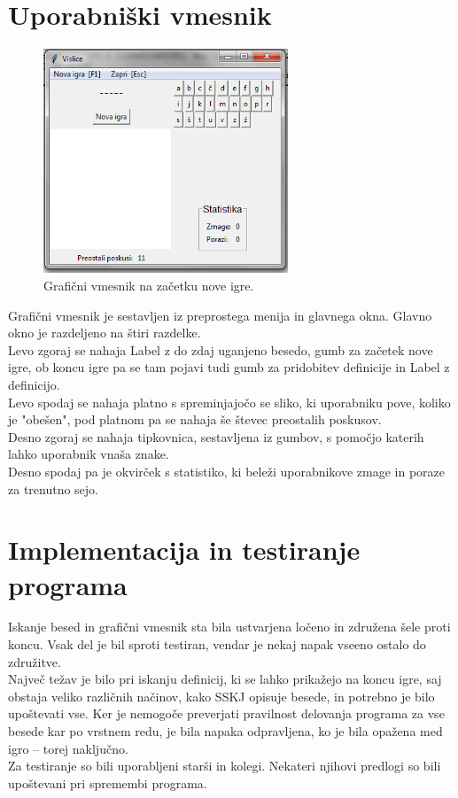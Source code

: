 \documentclass [a4paper, 12pt] {article}
\begin{document}
\section {Uporabniški vmesnik}
\begin {figure} [h]
\centering
\includegraphics [height=190pt] {slike/za_porocilo_gui.png}
\caption {Grafični vmesnik na začetku nove igre.}
\end {figure}
\noindent Grafični vmesnik je sestavljen iz preprostega menija in glavnega okna.  Glavno okno je razdeljeno na štiri razdelke. \\
Levo zgoraj se nahaja Label z do zdaj uganjeno besedo, gumb za začetek nove igre, ob koncu igre pa se tam pojavi tudi gumb za pridobitev definicije in Label z definicijo. \\
Levo spodaj se nahaja platno s spreminjajočo se sliko, ki uporabniku pove, koliko je "obešen", pod platnom pa se nahaja še števec preostalih poskusov.  \\
Desno zgoraj se nahaja tipkovnica, sestavljena iz gumbov, s pomočjo katerih lahko uporabnik vnaša znake. \\
Desno spodaj pa je okvirček s statistiko, ki beleži uporabnikove zmage in poraze za trenutno sejo. 

\section {Implementacija in testiranje programa}
Iskanje besed in grafični vmesnik sta bila ustvarjena ločeno in združena šele proti koncu. Vsak del je bil sproti testiran, vendar je nekaj napak vseeno ostalo do združitve. \\
Največ težav je bilo pri iskanju definicij, ki se lahko prikažejo na koncu igre, saj obstaja veliko različnih načinov, kako SSKJ opisuje besede, in potrebno je bilo upoštevati vse. Ker je nemogoče preverjati pravilnost delovanja programa za vse besede kar po vrstnem redu, je bila napaka odpravljena, ko je bila opažena med igro -- torej naključno. \\
Za testiranje so bili uporabljeni starši in kolegi. Nekateri njihovi predlogi so bili upoštevani pri spremembi programa.
\end{document}
